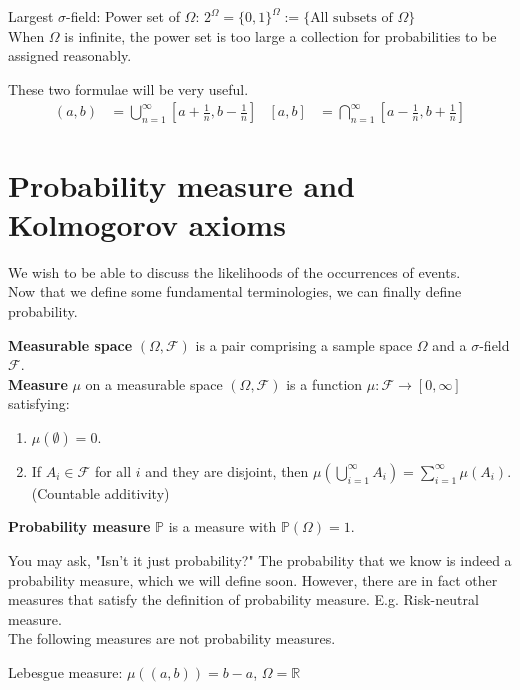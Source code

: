 \documentclass{huhtakm-template-book}
\newcommand{\prob}{\mathbb{P}}
\begin{document}
\begin{eg}
	Largest $\sigma$-field: Power set of $\Omega$: $2^{\Omega}=\{0,1\}^{\Omega}:=\{\text{All subsets of }\Omega\}$\\
	When $\Omega$ is infinite, the power set is too large a collection for probabilities to be assigned reasonably.
\end{eg}
\begin{rem}
	These two formulae will be very useful.
	\begin{align*}
		(a,b)&=\bigcup_{n=1}^{\infty}\left[a+\frac{1}{n},b-\frac{1}{n}\right] &             [a,b]&=\bigcap_{n=1}^{\infty}\left[a-\frac{1}{n},b+\frac{1}{n}\right]
	\end{align*}
\end{rem}

\section{Probability measure and Kolmogorov axioms}
We wish to be able to discuss the likelihoods of the occurrences of events.\\
Now that we define some fundamental terminologies, we can finally define probability.
\begin{defn}
	\textbf{Measurable space} $(\Omega,\mathcal{F})$ is a pair comprising a sample space $\Omega$ and a $\sigma$-field $\mathcal{F}$.\\
	\textbf{Measure} $\mu$ on a measurable space $(\Omega,\mathcal{F})$ is a function $\mu:\mathcal{F}\to [0,\infty]$ satisfying:
	\begin{enumerate}
		\item $\mu(\emptyset)=0$.
		\item If $A_{i}\in\mathcal{F}$ for all $i$ and they are disjoint, then $\mu(\bigcup_{i=1}^{\infty}A_{i})=\sum_{i=1}^{\infty}\mu(A_{i})$. (Countable additivity)
	\end{enumerate}
	\textbf{Probability measure} $\prob$ is a measure with $\prob(\Omega)=1$.
\end{defn}
You may ask, "Isn't it just probability?" The probability that we know is indeed a probability measure, which we will define soon. However, there are in fact other measures that satisfy the definition of probability measure. E.g. Risk-neutral measure.\\
The following measures are not probability measures.
\begin{eg}
	Lebesgue measure: $\mu((a,b))=b-a$, $\Omega=\mathbb{R}$
\end{eg}
\end{document}
